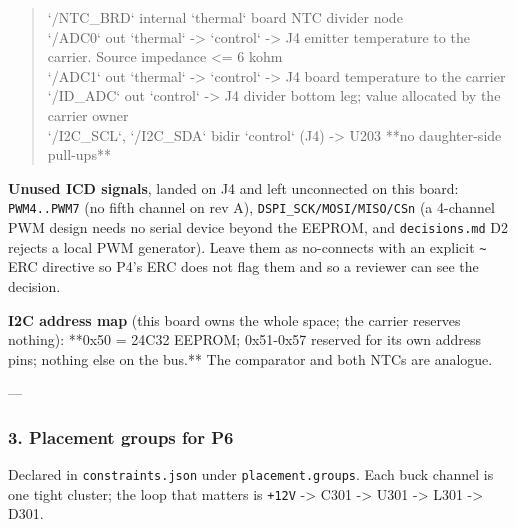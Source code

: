 \documentclass[11pt,a4paper]{article}
\begin{document}
\begin{quote}
\textbar{} `/NTC\_BRD` \textbar{} internal \textbar{} `thermal` \textbar{} board NTC divider node \textbar{}\\
\textbar{} `/ADC0` \textbar{} out \textbar{} `thermal` -\textgreater{} `control` -\textgreater{} J4 \textbar{} emitter temperature to the carrier. Source impedance \textless{}= 6 kohm \textbar{}\\
\textbar{} `/ADC1` \textbar{} out \textbar{} `thermal` -\textgreater{} `control` -\textgreater{} J4 \textbar{} board temperature to the carrier \textbar{}\\
\textbar{} `/ID\_ADC` \textbar{} out \textbar{} `control` -\textgreater{} J4 \textbar{} divider bottom leg; value allocated by the carrier owner \textbar{}\\
\textbar{} `/I2C\_SCL`, `/I2C\_SDA` \textbar{} bidir \textbar{} `control` (J4) -\textgreater{} U203 \textbar{} {*}{*}no daughter-side pull-ups{*}{*} \textbar{}
\end{quote}
\textbf{Unused ICD signals}, landed on J4 and left unconnected on this board: \texttt{PWM4..PWM7} (no fifth channel on rev A), \texttt{DSPI\_SCK/MOSI/MISO/CSn} (a 4-channel PWM design needs no serial device beyond the EEPROM, and \texttt{decisions.md} D2 rejects a local PWM generator). Leave them as no-connects with an explicit \texttt{\textasciitilde{}} ERC directive so P4's ERC does not flag them and so a reviewer can see the decision.

\textbf{I2C address map} (this board owns the whole space; the carrier reserves nothing): {*}{*}0x50 = 24C32 EEPROM; 0x51-0x57 reserved for its own address pins; nothing else on the bus.{*}{*} The comparator and both NTCs are analogue.

---

\subsubsection*{3. Placement groups for P6}
Declared in \texttt{constraints.json} under \texttt{placement.groups}. Each buck channel is one tight cluster; the loop that matters is \texttt{+12V} -\textgreater{} C301 -\textgreater{} U301 -\textgreater{} L301 -\textgreater{} D301.
\end{document}
